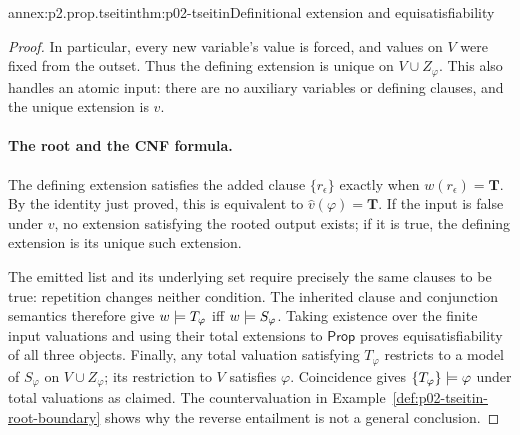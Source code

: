 \begin{annexitem}{annex:p2.prop.tseitin}{thm:p02-tseitin}{Definitional extension and equisatisfiability}
\begin{proof}
In particular, every new variable's value is forced, and values on \(V\)
were fixed from the outset.  Thus the defining extension is unique on
\(V\cup Z_\varphi\).  This also handles an atomic input: there are no
auxiliary variables or defining clauses, and the unique extension is \(v\).

\paragraph{The root and the CNF formula.}
The defining extension satisfies the added clause \(\{r_\epsilon\}\)
exactly when \(w(r_\epsilon)=\mathbf{T}\).  By the identity just proved, this
is equivalent to \(\widehat v(\varphi)=\mathbf{T}\).  If the input is false
under \(v\), no extension satisfying the rooted output exists; if it is
true, the defining extension is its unique such extension.

The emitted list and its underlying set require precisely the same clauses
to be true: repetition changes neither condition.  The inherited clause
and conjunction semantics therefore give
\(w\models T_\varphi\) iff \(w\models S_\varphi\).
Taking existence over the finite input valuations and using their total
extensions to \(\mathsf{Prop}\) proves equisatisfiability of all three objects.
Finally, any total valuation satisfying \(T_\varphi\) restricts to a
model of \(S_\varphi\) on \(V\cup Z_\varphi\); its restriction to
\(V\) satisfies \(\varphi\).  Coincidence gives
\(\{T_\varphi\}\models\varphi\) under total valuations as claimed.
The countervaluation in Example~\ref{def:p02-tseitin-root-boundary} shows why
the reverse entailment is not a general conclusion.
\end{proof}
\end{annexitem}

